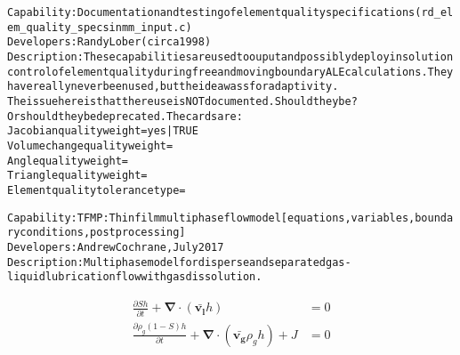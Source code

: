 \documentclass{article}
\begin{document}
\begin{alltt}
Capability: Documentation and testing of element quality specifications (rd_elem_quality_specs in mm_input.c)
Developers: Randy Lober (circa 1998)
Description: These capabilities are used to ouput and possibly deploy in solution control of element quality during free and moving boundary ALE calculations.  They have really never been used, but the idea wass for adaptivity.  
The issue here is that there use is NOT documented.    Should they be?  Or should they be deprecated.   The cards are:
Jacobian quality weight= yes | TRUE
Volume change quality weight=
Angle quality weight=
Triangle quality weight=
Element quality tolerance type=

Capability: TFMP: Thin film multiphase flow model [equations, variables, boundary conditions, post processing]
Developers: Andrew Cochrane, July 2017
Description: Multiphase model for disperse and separated gas-liquid lubrication flow with gas dissolution.
\end{alltt}
\begin{align*}
 \frac{\partial Sh}{\partial t} + \bm{\nabla \cdot} (\bm{\bar{v_l}}h) &= 0 \\
 \frac{\partial \rho_g(1-S)h}{\partial t} + \bm {\nabla} \cdot (\bm{\bar{v_g}}\rho_gh) + J &= 0
\end{align*}
\end{document}

